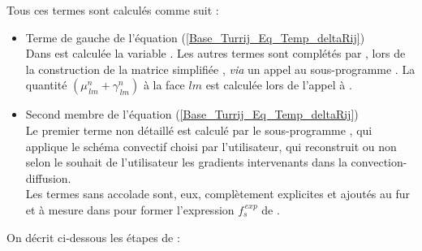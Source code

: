 Tous ces termes sont calcul\'es comme suit :
\begin{itemize}
\item Terme de gauche de l'\'equation (\ref{Base_Turrij_Eq_Temp_deltaRij})\\
Dans  est calcul\'ee la variable . Les autres
termes sont compl\'et\'es par , lors de la construction de la matrice simplifi\'ee , {\it via} un
appel au sous-programme . La quantit\'e
 $(\mu^n_{\,lm} + \gamma^n_{\,lm})$ \`a la face $lm$ est calcul\'ee lors de l'appel \`a
.\\
\item Second membre de l'\'equation (\ref{Base_Turrij_Eq_Temp_deltaRij})\\
Le premier terme non d\'etaill\'e est calcul\'e par le sous-programme
, qui applique le sch\'ema convectif choisi par l'utilisateur, qui
reconstruit ou non selon le souhait de l'utilisateur les gradients intervenants
dans la convection-diffusion.\\
Les termes sans accolade sont, eux, compl\`etement explicites et ajout\'es au fur et
\`a mesure dans  pour former
l'expression $f^{\,exp}_s$ de .
\end{itemize}
On d\'ecrit ci-dessous les \'etapes de  :
